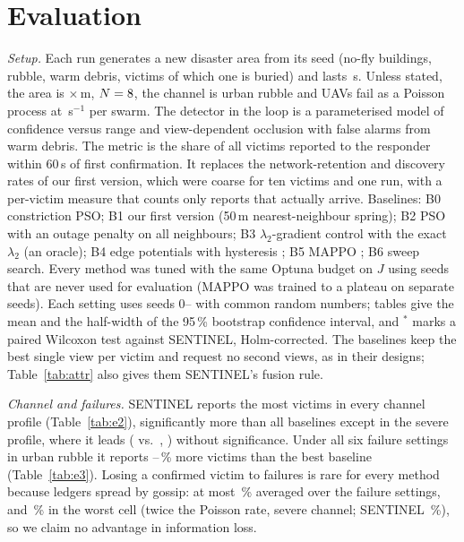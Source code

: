 \documentclass[conference]{IEEEtran}
\begin{document}
\section{Evaluation}\label{sec:eval}
\emph{Setup.} Each run generates a new disaster area from its seed (no-fly buildings, rubble, warm
debris, \nVictims{} victims of which one is buried) and lasts \nDuration\,s. Unless stated, the area
is \nArea$\times$\nArea\,m, $N=8$, the channel is urban rubble and UAVs fail as a Poisson process
at \nFailRate\,s$^{-1}$ per swarm. The detector
in the loop is a parameterised model of confidence versus range and view-dependent occlusion with
false alarms from warm debris. The metric is the share of all victims reported to the responder
within 60\,s of first confirmation. It replaces the network-retention and discovery rates of our
first version, which were coarse for ten victims and one run, with a per-victim measure that counts
only reports that actually arrive. Baselines: B0 constriction PSO; B1 our first version (50\,m
nearest-neighbour spring); B2 PSO with an outage penalty on all neighbours; B3 $\lambda_2$-gradient
control \cite{sabattini2013} with the exact $\lambda_2$ (an oracle); B4 edge potentials with hysteresis
\cite{ji2007}; B5 MAPPO \cite{yu2022mappo}; B6 sweep search. Every method was tuned with the same
Optuna budget on $J$ using seeds that are never used for evaluation (MAPPO was trained to a plateau on
separate seeds). Each setting uses seeds 0--\nSeedMax{} with common random numbers; tables give the mean and
the half-width of the 95\,\% bootstrap confidence interval, and $^*$ marks a paired Wilcoxon test
against SENTINEL, Holm-corrected. The baselines keep the best single view per victim and request no
second views, as in their designs; Table~\ref{tab:attr} also gives them SENTINEL's fusion rule.

\emph{Channel and failures.} SENTINEL reports the most victims in every channel profile
(Table~\ref{tab:e2}), significantly more than all baselines except in the severe profile, where it
leads (\nEtwoSevS{} vs.\ \nEtwoSevB{}, \nEtwoSevBname) without significance. Under all six failure
settings in urban rubble it reports \nEthreeGainLo--\nEthreeGainHi\,\% more victims than the best
baseline (Table~\ref{tab:e3}). Losing a confirmed victim to failures is rare for every method
because ledgers spread by gossip: at most \nLossAvgMax\,\% averaged over the failure settings, and
\nLossWorst\,\% in the worst cell (twice the Poisson rate, severe channel; SENTINEL \nLossWorstS\,\%),
so we claim no advantage in information loss.


\end{document}
